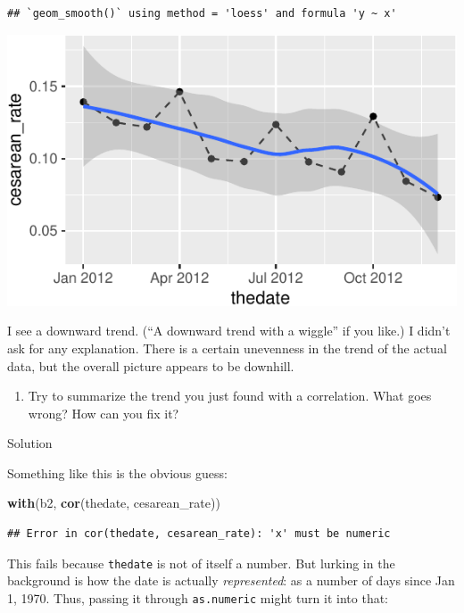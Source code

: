 \documentclass[]{tufte-book}
\newenvironment{Shaded}{}{}
\newcommand{\KeywordTok}[1]{\textcolor[rgb]{0.00,0.44,0.13}{\textbf{#1}}}
\newcommand{\NormalTok}[1]{#1}
\providecommand{\tightlist}{%
  \setlength{\itemsep}{0pt}\setlength{\parskip}{0pt}}
\theoremstyle{definition}
\theoremstyle{definition}
\theoremstyle{definition}
\theoremstyle{remark}
\begin{document}
\begin{verbatim}
## `geom_smooth()` using method = 'loess' and formula 'y ~ x'
\end{verbatim}

\includegraphics{13-dates-and-times_files/figure-latex/unnamed-chunk-21-1}

I see a downward trend. (``A downward trend with a wiggle'' if you
like.) I didn't ask for any explanation. There is a certain unevenness
in the trend of the actual data, but the overall picture appears to be
downhill.

\begin{enumerate}
\def\labelenumi{(\alph{enumi})}
\setcounter{enumi}{3}
\tightlist
\item
  Try to summarize the trend you just found with a correlation. What
  goes wrong? How can you fix it?
\end{enumerate}

Solution

Something like this is the obvious guess:

\begin{Shaded}
\begin{Highlighting}[]
\KeywordTok{with}\NormalTok{(b2, }\KeywordTok{cor}\NormalTok{(thedate, cesarean_rate))}
\end{Highlighting}
\end{Shaded}

\begin{verbatim}
## Error in cor(thedate, cesarean_rate): 'x' must be numeric
\end{verbatim}

This fails because \texttt{thedate} is not of itself a number. But
lurking in the background is how the date is actually
\emph{represented}: as a number of days since Jan 1, 1970. Thus, passing
it through \texttt{as.numeric} might turn it into that:
\end{document}

